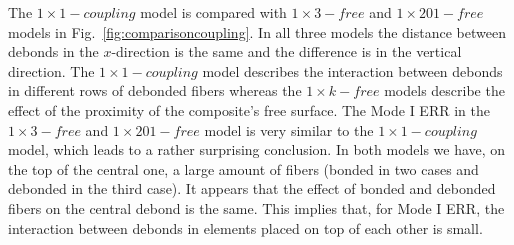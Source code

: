 \documentclass[review]{elsarticle}
\begin{document}
The $1\times 1-coupling$ model is compared with $1\times 3-free$ and $1\times 201-free$ models in Fig.~\ref{fig:comparisoncoupling}. In all three models the distance between debonds in the $x$-direction is the same and the difference is in the vertical direction. The $1\times 1-coupling$ model describes the interaction between debonds in different rows of debonded fibers whereas the $1\times k-free$ models describe the effect of the proximity of the composite's free surface. The Mode I ERR in the $1\times 3-free$ and $1\times 201-free$ model is very similar to the $1\times 1-coupling$ model, which leads to a rather surprising conclusion. In both models we have, on the top of the central one, a large amount of fibers (bonded in two cases and debonded in the third case). It appears that the effect of bonded and debonded fibers on the central debond is the same. This implies that, for Mode I ERR, the interaction between debonds in elements placed on top of each other is small.
\end{document}
